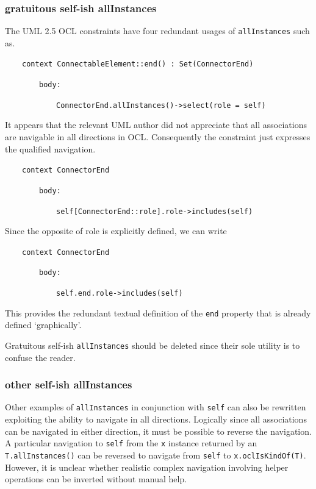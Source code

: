 \documentclass[
]{ceurart}
\begin{document}
\subsubsection{gratuitous self-ish allInstances}

The UML 2.5 OCL constraints have four redundant usages of \verb!allInstances! such as.

\begin{description}[itemsep=-0.2cm]\small
\item ~~~~\verb!context ConnectableElement::end() : Set(ConnectorEnd)!
\item ~~~~~~~~\verb!body:!
\item ~~~~~~~~~~~~\verb!ConnectorEnd.allInstances()->select(role = self)!
\end{description}

It appears that the relevant UML author did not appreciate that all associations are navigable in all directions in OCL. Consequently the constraint just expresses the qualified navigation.
\begin{description}[itemsep=-0.2cm]\small
\item ~~~~\verb!context ConnectorEnd!
\item ~~~~~~~~\verb!body:!
\item ~~~~~~~~~~~~\verb!self[ConnectorEnd::role].role->includes(self)!
\end{description}

Since the opposite of role is explicitly defined, we can write

\begin{description}[itemsep=-0.2cm]\small
\item ~~~~\verb!context ConnectorEnd!
\item ~~~~~~~~\verb!body:!
\item ~~~~~~~~~~~~\verb!self.end.role->includes(self)!
\end{description}

This provides the redundant textual definition of the \verb!end! property that is already defined `graphically'.

Gratuitous self-ish \verb!allInstances! should be deleted since their sole utility is to confuse the reader.

\subsubsection{other self-ish allInstances}

Other examples of \verb!allInstances! in conjunction with \verb!self! can also be rewritten exploiting the ability to navigate in all directions. Logically since all associations can be navigated in either direction, it must be possible to reverse the navigation. A particular navigation to \verb!self! from the \verb!x! instance returned by an \verb!T.allInstances()!  can be reversed to navigate from \verb!self! to \verb!x.oclIsKindOf(T)!. However, it is unclear whether realistic complex navigation involving helper operations can be inverted without manual help.
\end{document}
